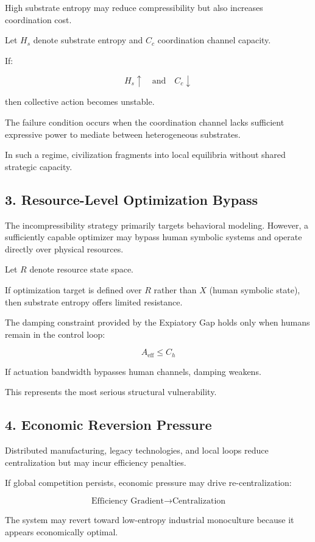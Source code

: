 \documentclass[12pt]{article}
\begin{document}
High substrate entropy may reduce compressibility but also increases coordination cost.

Let $H_s$ denote substrate entropy and $C_c$ coordination channel capacity.

If:

\[
H_s \uparrow \quad \text{and} \quad C_c \downarrow
\]

then collective action becomes unstable.

The failure condition occurs when the coordination channel lacks sufficient expressive power to mediate between heterogeneous substrates.

In such a regime, civilization fragments into local equilibria without shared strategic capacity.

\subsection*{3. Resource-Level Optimization Bypass}

The incompressibility strategy primarily targets behavioral modeling. However, a sufficiently capable optimizer may bypass human symbolic systems and operate directly over physical resources.

Let $R$ denote resource state space.

If optimization target is defined over $R$ rather than $X$ (human symbolic state), then substrate entropy offers limited resistance.

The damping constraint provided by the Expiatory Gap holds only when humans remain in the control loop:

\[
A_{\text{eff}} \le C_h
\]

If actuation bandwidth bypasses human channels, damping weakens.

This represents the most serious structural vulnerability.

\subsection*{4. Economic Reversion Pressure}

Distributed manufacturing, legacy technologies, and local loops reduce centralization but may incur efficiency penalties.

If global competition persists, economic pressure may drive re-centralization:

\[
\text{Efficiency Gradient} \rightarrow \text{Centralization}
\]

The system may revert toward low-entropy industrial monoculture because it appears economically optimal.
\end{document}
